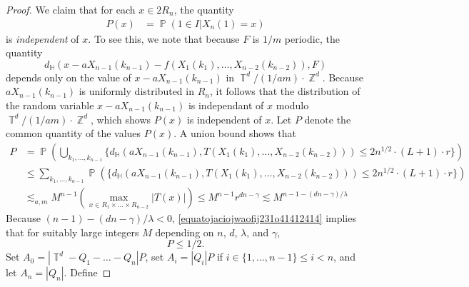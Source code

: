 \documentclass[dvipsnames,letterpaper,12pt]{article}
\numberwithin{equation}{section}
\DeclareMathOperator{\ZZ}{\mathbb{Z}}
\DeclareMathOperator{\TT}{\mathbb{T}}
\numberwithin{theorem}{section}
\DeclareMathOperator{\PP}{\mathbb{P}}
\begin{document}
\begin{proof}
    We claim that for each $x \in 2R_n$, the quantity
    \begin{align*}
        P(x) &= \PP ( 1 \in I | X_n(1) = x)%
    \end{align*}
    is \emph{independent} of $x$. To see this, we note that because $F$ is $1/m$ periodic, the quantity
    \[ d_{\mathbb{H}}(x - a X_{n-1}(k_{n-1}) - f(X_1(k_1), \dots, X_{n-2}(k_{n-2})) , F) \]
    depends only on the value of $x - a X_{n-1}(k_{n-1})$ in $\TT^d / (1/am) \cdot \ZZ^d$. Because $a X_{n-1}(k_{n-1})$ is uniformly distributed in $R_n$, it follows that the distribution of the random variable $x - a X_{n-1}(k_{n-1})$ is independant of $x$ modulo $\TT^d / (1/am) \cdot \ZZ^d$, which shows $P(x)$ is independent of $x$. Let $P$ denote the common quantity of the values $P(x)$. A union bound shows that
    \begin{equation} \label{equatojaciojwaofij231o41412414}
    \begin{split}
        P &= \PP \left( \bigcup_{k_1,\dots,k_{n-1}} \Big\{ d_{\mathbb{H}}(a X_{n-1}(k_{n-1}), T(X_1(k_1),\dots, X_{n-2}(k_{n-2}))) \leq 2 n^{1/2} \cdot (L+1) \cdot r \Big\} \right)\\
        &\leq \sum_{k_1,\dots,k_{n-1}} \PP \left( \Big\{ d_{\mathbb{H}}(a X_{n-1}(k_{n-1}), T(X_1(k_1),\dots, X_{n-2}(k_{n-2}))) \leq 2 n^{1/2} \cdot (L+1) \cdot r \Big\} \right) \\
        &\lesssim_{a,m} M^{n-1} \left( \max_{x \in R_1 \times \dots \times R_{n-2}} |T(x)| \right) \leq M^{n-1} r^{dn-\gamma} \lesssim M^{n - 1 - (dn - \gamma)/\lambda}
    \end{split}
    \end{equation}
    Because $(n-1) - (dn - \gamma)/\lambda < 0$, \eqref{equatojaciojwaofij231o41412414} implies that for suitably large integers $M$ depending on $n$, $d$, $\lambda$, and $\gamma$,
    \begin{equation}
        P \leq 1/2.
    \end{equation}
    Set $A_0 = |\TT^d - Q_1 - \dots - Q_n| P$, set $A_i = |Q_i| P$ if $i \in \{ 1, \dots, n - 1 \} \leq i < n$, and let $A_n = |Q_n|$. Define

\end{proof}
\end{document}
